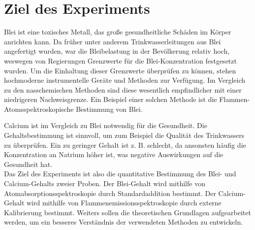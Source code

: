 \section{Ziel des Experiments}

  Blei ist eine toxisches Metall, das große gesundheitliche Schäden im Körper anrichten kann. Da früher unter anderem Trinkwasserleitungen aus Blei angefertigt wurden, war die Bleibelastung in der Bevölkerung relativ hoch, weswegen von Regierungen Grenzwerte für die Blei-Konzentration festgesetzt wurden.\citep{UmweltbundesamtBlei} Um die Einhaltung dieser Grenzwerte überprüfen zu können, stehen hochmoderne instrumentelle Geräte und Methoden zur Verfügung. Im Vergleich zu den nasschemischen Methoden sind diese wesentlich empfindlicher mit einer niedrigeren Nachweisgrenze. Ein Beispiel einer solchen Methode ist die Flammen-Atomsspektroskopische Bestimmung von Blei. \citep{Mikromethode} 
  
  Calcium ist im Vergleich zu Blei notwendig für die Gesundheit. Die Gehaltsbestimmung ist sinnvoll, um zum Beispiel die Qualität des Trinkwassers zu überprüfen. Ein zu geringer Gehalt ist z. B. schlecht, da ansonsten häufig die Konzentration an Natrium höher ist, was negative Auswirkungen auf die Gesundheit hat.\citep{CalciumGrenzwert} \\
  
  Das Ziel des Experiments ist also die quantitative Bestimmung des Blei- und Calcium-Gehalts zweier Proben. Der Blei-Gehalt wird mithilfe von Atomabsorptionsspektroskopie durch Standardaddition bestimmt. Der Calcium-Gehalt wird mithilfe von Flammenemissionsspektroskopie durch externe Kalibrierung bestimmt. Weiters sollen die theoretischen Grundlagen aufgearbeitet werden, um ein besseres Verständnis der verwendeten Methoden zu entwickeln. 